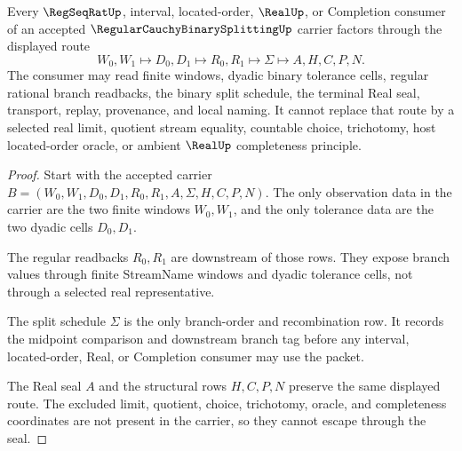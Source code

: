 \begin{theorem}
\label{thm:regular-cauchy-binary-splitting-real-seal-nonescape}
Every $\RegSeqRatUp$, interval, located-order, $\RealUp$, or Completion consumer of an accepted $\RegularCauchyBinarySplittingUp$ carrier factors through the displayed route
$$
W_0,W_1 \longmapsto D_0,D_1 \longmapsto R_0,R_1 \longmapsto \Sigma \longmapsto A,H,C,P,N .
$$
The consumer may read finite windows, dyadic binary tolerance cells, regular rational branch readbacks, the binary split schedule, the terminal Real seal, transport, replay, provenance, and local naming. It cannot replace that route by a selected real limit, quotient stream equality, countable choice, trichotomy, host located-order oracle, or ambient $\RealUp$ completeness principle.
\end{theorem}
\begin{proof}
Start with the accepted carrier $B=(W_0,W_1,D_0,D_1,R_0,R_1,A,\Sigma,H,C,P,N)$. The only observation data in the carrier are the two finite windows $W_0,W_1$, and the only tolerance data are the two dyadic cells $D_0,D_1$.

The regular readbacks $R_0,R_1$ are downstream of those rows. They expose branch values through finite StreamName windows and dyadic tolerance cells, not through a selected real representative.

The split schedule $\Sigma$ is the only branch-order and recombination row. It records the midpoint comparison and downstream branch tag before any interval, located-order, Real, or Completion consumer may use the packet.

The Real seal $A$ and the structural rows $H,C,P,N$ preserve the same displayed route. The excluded limit, quotient, choice, trichotomy, oracle, and completeness coordinates are not present in the carrier, so they cannot escape through the seal.
\end{proof}



